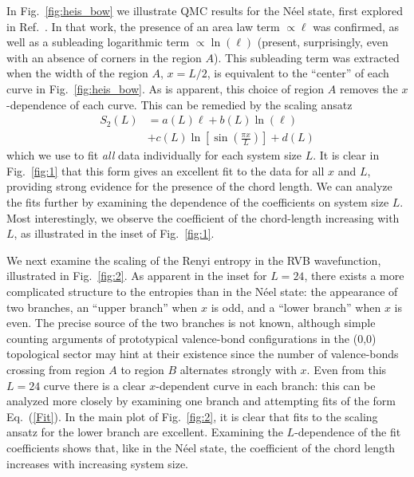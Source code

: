 \documentclass[prl,aps,twocolumn,floatfix,amsmath,amssymb,superscriptaddress,tightenlines]{revtex4}
\begin{document}
In Fig.~{\ref{fig:heis_bow}} we illustrate QMC results for the N\'eel state, first explored in Ref.~\cite{HeisLog}.  In that work, the presence of an area law term $\propto \ell$ was confirmed, as well as a subleading logarithmic term $\propto \ln(\ell)$ (present, surprisingly, even with an absence of corners in the region $A$).  This subleading term was extracted when the width of the region $A$, $x = L/2$, is equivalent to the ``center'' of each curve in Fig.~{\ref{fig:heis_bow}}.  As is apparent, this choice of region $A$ removes the $x$-dependence of each curve.  This can be remedied
by the scaling ansatz
\begin{align}
S_2(L) &= a(L) \ell + b(L) \ln(\ell) \nonumber \\
&+ c(L) \ln \left[{ \sin\left({ \frac{\pi x}{L} }\right) }\right] + d(L) \label{Fit}
\end{align}
{\color{red} which we use to fit {\it all} data individually for each system size $L$. }
It is clear in Fig.~{\ref{fig:1}} that this form gives an excellent fit to the data for all $x$ and $L$, providing strong evidence for the presence of the chord length.  We can analyze the fits further by examining the dependence of the coefficients on system size $L$.  Most interestingly, we observe the coefficient of the chord-length increasing with $L$, as illustrated in the inset of Fig.~{\ref{fig:1}}.

We next examine the scaling of the Renyi entropy in the RVB wavefunction, illustrated in Fig.~{\ref{fig:2}}.  As apparent in the inset for $L=24$, there exists a more complicated structure to the entropies than in the N\'eel state: the appearance of two branches, an ``upper branch'' when $x$ is odd, and a ``lower branch'' when $x$ is even.  The precise source of the two branches is not known, although simple counting arguments of prototypical valence-bond configurations in the (0,0) topological sector may hint at their existence since the number of valence-bonds crossing from region $A$ to region $B$ alternates strongly with $x$.  Even from this $L=24$ curve there is a clear $x$-dependent curve in each branch: this can be analyzed more closely by examining one branch and attempting fits of the form Eq.~(\ref{Fit}).  In the main plot of Fig.~{\ref{fig:2}}, it is clear that fits to the scaling ansatz for the lower branch are excellent.  Examining the $L$-dependence of the fit coefficients shows that, like in the N\'eel state, the coefficient of the chord length increases with increasing system size.
\end{document}
